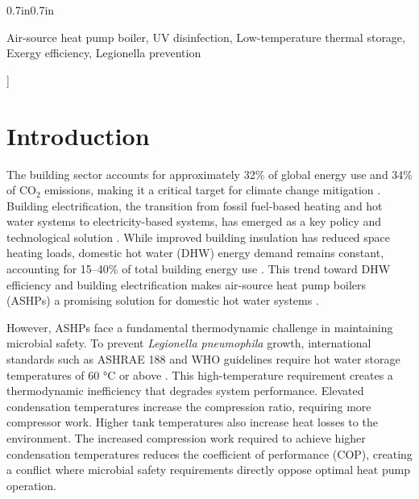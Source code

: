 \documentclass[letterpaper,10pt]{article}
\begin{document}
\begin{@twocolumnfalse}
\begin{adjustwidth}{0.7in}{0.7in}
\vspace{8pt}
 {\fontsize{9pt}{9pt}\selectfont Air-source heat pump boiler, UV disinfection, Low-temperature thermal storage, Exergy efficiency, Legionella prevention\par}
\end{adjustwidth}

\vspace{22pt}
\end{@twocolumnfalse}
]

\makeatletter
\renewcommand{\@makefntext}[1]{\noindent#1}
\makeatother
\let\thefootnote\relax{}

\section{Introduction}
\label{sec:intro}

The building sector accounts for approximately 32\% of global energy use and 34\% of CO$_2$ emissions, making it a critical target for climate change mitigation \cite{unep2024global}. Building electrification, the transition from fossil fuel-based heating and hot water systems to electricity-based systems, has emerged as a key policy and technological solution \cite{irena2020renewable}. While improved building insulation has reduced space heating loads, domestic hot water (DHW) energy demand remains constant, accounting for 15--40\% of total building energy use \cite{fuentes2018review_dhw}. This trend toward DHW efficiency and building electrification makes air-source heat pump boilers (ASHPs) a promising solution for domestic hot water systems \cite{staffell2012review_ashp}.

However, ASHPs face a fundamental thermodynamic challenge in maintaining microbial safety. To prevent \textit{Legionella pneumophila} growth, international standards such as ASHRAE 188 and WHO guidelines require hot water storage temperatures of 60 °C or above \cite{ashrae188_2021, who2022guidelines}. This high-temperature requirement creates a thermodynamic inefficiency that degrades system performance. Elevated condensation temperatures increase the compression ratio, requiring more compressor work. Higher tank temperatures also increase heat losses to the environment. The increased compression work required to achieve higher condensation temperatures reduces the coefficient of performance (COP), creating a conflict where microbial safety requirements directly oppose optimal heat pump operation.
\end{document}
